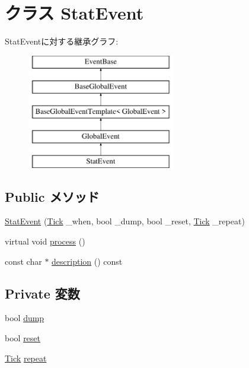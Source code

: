 \hypertarget{classStats_1_1StatEvent}{
\section{クラス StatEvent}
\label{classStats_1_1StatEvent}
}
StatEventに対する継承グラフ:\begin{figure}[H]
\begin{center}
\leavevmode
\includegraphics[height=5cm]{classStats_1_1StatEvent}
\end{center}
\end{figure}
\subsection*{Public メソッド}
\begin{DoxyCompactItemize}
\item 
\hyperlink{classStats_1_1StatEvent_a85b93ac1b7f89e98a895fce4b27cc5f9}{StatEvent} (\hyperlink{base_2types_8hh_a5c8ed81b7d238c9083e1037ba6d61643}{Tick} \_\-when, bool \_\-dump, bool \_\-reset, \hyperlink{base_2types_8hh_a5c8ed81b7d238c9083e1037ba6d61643}{Tick} \_\-repeat)
\item 
virtual void \hyperlink{classStats_1_1StatEvent_a6780fc1879338e1ff38faf7279ec6a0b}{process} ()
\item 
const char $\ast$ \hyperlink{classStats_1_1StatEvent_a2bd90422eece9190794479e08092a252}{description} () const 
\end{DoxyCompactItemize}
\subsection*{Private 変数}
\begin{DoxyCompactItemize}
\item 
bool \hyperlink{classStats_1_1StatEvent_aa833038bb03159a6825c0bbc29789875}{dump}
\item 
bool \hyperlink{classStats_1_1StatEvent_a8409a0d351d4fba2eeef26a7dcc585a8}{reset}
\item 
\hyperlink{base_2types_8hh_a5c8ed81b7d238c9083e1037ba6d61643}{Tick} \hyperlink{classStats_1_1StatEvent_a186e97c430ff343e8ab14129eaa8375d}{repeat}
\end{DoxyCompactItemize}


